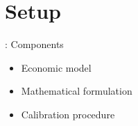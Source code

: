 \section{Setup}
\begin{frame}{\insertsection: Components}
\begin{itemize}
\item Economic model
\item Mathematical formulation
\item Calibration procedure
\end{itemize}
\end{frame}





